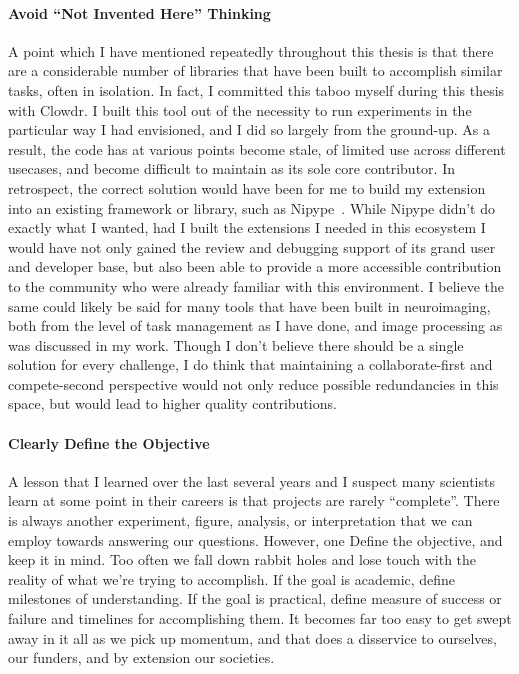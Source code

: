 \paragraph*{Avoid ``Not Invented Here'' Thinking}
A point which I have mentioned repeatedly throughout this thesis is that there are a considerable number of
libraries that have been built to accomplish similar tasks, often in isolation. In fact, I committed this taboo
myself during this thesis with Clowdr. I built this tool out of the necessity to run experiments in the particular
way I had envisioned, and I did so largely from the ground-up. As a result, the code has at various points become
stale, of limited use across different usecases, and become difficult to maintain as its sole core contributor. In
retrospect, the correct solution would have been for me to build my extension into an existing framework or library,
such as Nipype~\cite{gorgolewski2011nipype}. While Nipype didn't do exactly what I wanted, had I built the
extensions I needed in this ecosystem I would have not only gained the review and debugging support of its grand
user and developer base, but also been able to provide a more accessible contribution to the community who were
already familiar with this environment. I believe the same could likely be said for many tools that have been built
in neuroimaging, both from the level of task management as I have done, and image processing as was discussed in my
work. Though I don't believe there should be a single solution for every challenge, I do think that maintaining a
collaborate-first and compete-second perspective would not only reduce possible redundancies in this space, but
would lead to higher quality contributions.

\paragraph*{Clearly Define the Objective}
A lesson that I learned over the last several years and I suspect many scientists learn at some point in their careers
is that projects are rarely ``complete''. There is always another experiment, figure, analysis, or interpretation that
we can employ towards answering our questions. However, one 
 Define the objective, and keep it in mind. Too often we fall down rabbit holes and lose touch with the reality of what
we're trying to accomplish. If the goal is academic, define milestones of understanding. If the goal is practical,
define measure of success or failure and timelines for accomplishing them. It becomes far too easy to get swept away in
it all as we pick up momentum, and that does a disservice to ourselves, our funders, and by extension our societies.


